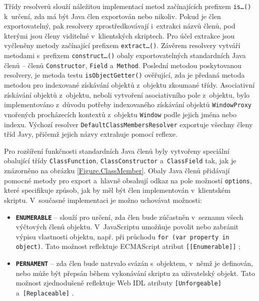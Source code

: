 Třídy resolverů slouží náležitou implementací metod začínajících prefixem \texttt{is\ldots()} k~určení, zda má být Java člen exportován nebo nikoliv. Pokud je člen exportovatelný, pak resolvery zprostředkovávají i~extrakci názvů členů, pod kterými jsou členy viditelné v~klientských skriptech. Pro účel extrakce jsou vyčleněny metody začínající prefixem \texttt{extract\ldots()}. Závěrem resolvery vytváří metodami s~prefixem \texttt{construct\ldots()} obaly exportovatelných standardních Java členů -- členů \texttt{Constructor}, \texttt{Field} a~\texttt{Method}. Poslední metodou poskytovanou resolvery, je metoda testu \texttt{isObjectGetter()} ověřující, zda je předaná metoda metodou pro indexované získávání objektů z~objektu zkoumané třídy. Asociativní získávání objektů z~objektu, neboli vytvoření asociativního pole z~objektu, bylo implementováno z~důvodu potřeby indexovaného získávání objektů \texttt{WindowProxy} vnořených procházecích kontextů z~objektu \texttt{Window} podle jejich jména nebo indexu. Výchozí resolver \texttt{DefaultClassMembersResolver} exportuje všechny členy tříd Javy, přičemž jejich názvy extrahuje pomocí reflexe.

Pro rozšíření funkčnosti standardních Java členů byly vytvořeny speciální obalující třídy \texttt{ClassFunction}, \texttt{ClassConstructor} a~\texttt{ClassField} tak, jak je znázorněno na obrázku \ref{Figure.ClassMember}. Obaly Java členů přidávají pomocné metody pro export a~hlavně obsahují odkaz na pole možností \texttt{options}, které specifikuje způsob, jak by měl být člen implementován v~klientském skriptu. V~současné implementaci je možno uchovávat možnosti:

\begin{itemize}
  \item \textbf{\texttt{ENUMERABLE}} -- slouží pro určení, zda člen bude zúčastněn v~seznamu všech výčtových členů objektu. V~JavaScriptu umožňuje povolit nebo zabránit výpisu vlastnosti objektu, např. při průchodu \texttt{for (var property in object)}. Tato možnost reflektuje ECMAScript atribut \texttt{[[Enumerable]]} \cite{Bibliography.ECMAStandard};
  \item \textbf{\texttt{PERNAMENT}} -- zda člen bude natrvalo svázán s~objektem, v~němž je definován, nebo může být přepsán během vykonávání skriptu za uživatelský objekt. Tato možnost zjednodušeně reflektuje Web IDL atributy \texttt{[Unforgeable]} a~\texttt{[Replaceable]} \cite{Bibliography.WebIDL}.
\end{itemize}

